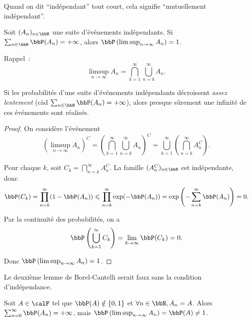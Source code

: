 \begin{rqq}
    Quand on dit ``indépendant'' tout court, cela signifie ``mutuellement indépendant''.
\end{rqq}

\begin{lem}
    Soit $(A_n)_{n \in \bbN}$ une suite d'événements indépendants.
    Si $\sum_{n \in \bbN} \bbP(A_n) = +\infty$, alors $\bbP\left(\limsup_{n \to \infty} A_n\right) = 1$.
\end{lem}

\begin{rqq}
    Rappel~:
    \[ \limsup_{n \to \infty} A_n = \bigcap_{k=1}^{\infty} \bigcup_{n=k}^{\infty} A_n. \]
\end{rqq}

\begin{rqq}[Interprétation]
    Si les probabilités d'une suite d'événements indépendants décroissent \textit{assez lentement}
    (càd $\sum_{n \in \bbN} \bbP(A_n) = +\infty$),
    alors presque sûrement une infinité de ces événements sont réalisés.
\end{rqq}

\begin{proof}
    On considère l'événement
    \[ \left(\limsup_{n \to \infty} A_n\right)^C =
        \left(\bigcap_{k = 1}^\infty \bigcup_{n = k}^\infty A_n\right)^C =
        \bigcup_{k = 1}^\infty \left(\bigcap_{n = k}^\infty A_n^C\right). \]

    Pour chaque $k$, soit $C_k = \bigcap_{n = k}^\infty A_n^C$.
    La famille $(A_n^C)_{n \in \bbN}$ est indépendante, donc
    \[ \bbP(C_k) = \prod_{n = k}^\infty (1 - \bbP(A_n))
        \leqslant \prod_{n = k}^\infty \exp(-\bbP(A_n))
        = \exp\left(-\sum_{n = k}^\infty \bbP(A_n)\right) = 0. \]

    Par la continuité des probabilités, on a
    \[ \bbP\left(\bigcup_{k = 1}^\infty C_k\right) = \lim_{k \to \infty} \bbP(C_k) = 0. \]

    Donc $\bbP\left(\limsup_{n \to \infty} A_n\right) = 1$.
\end{proof}

\begin{rqq}
    Le deuxième lemme de Borel-Cantelli serait faux sans la condition d'indépendance.
\end{rqq}

\begin{exem}
    Soit $A \in \calF$ tel que $\bbP(A) \notin \{ 0, 1 \}$ et $\forall n \in \bbN, A_n = A$.
    Alors $\sum_{n = 0}^\infty \bbP(A_n) = +\infty$,
    mais $\bbP\left(\limsup_{n \to \infty} A_n\right) = \bbP(A) \neq 1$.
\end{exem}

